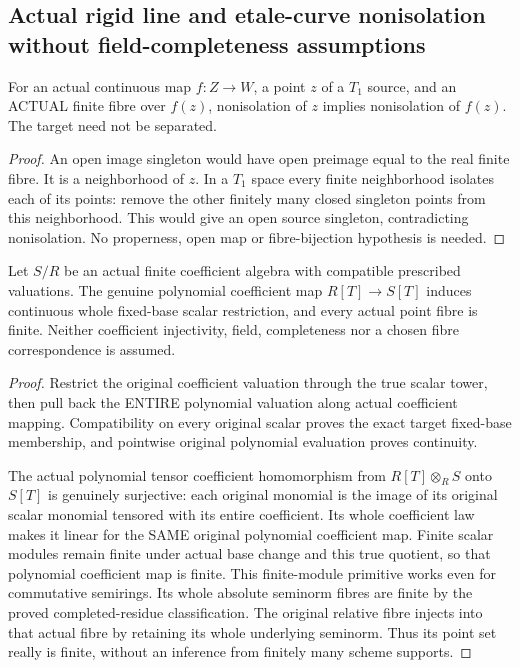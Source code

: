 \subsection{Actual rigid line and etale-curve nonisolation without field-completeness assumptions}
\label{subsec:rigid-etale-curve-nonisolation}

\begin{lemma}
\label{topology:actual-finite-fibre-nonisolation}
\leanok
For an actual continuous map $f:Z\to W$, a point $z$ of a $T_1$
source, and an ACTUAL finite fibre over $f(z)$, nonisolation of $z$
implies nonisolation of $f(z)$. The target need not be separated.
\end{lemma}
\begin{proof}
An open image singleton would have open preimage equal to the real
finite fibre. It is a neighborhood of $z$. In a $T_1$ space every
finite neighborhood isolates each of its points: remove the other
finitely many closed singleton points from this neighborhood. This
would give an open source singleton, contradicting nonisolation.
No properness, open map or fibre-bijection hypothesis is needed.
\end{proof}

\begin{theorem}
\label{spectrum:actual-finite-polynomial-scalar-restriction}
\leanok
{}
Let $S/R$ be an actual finite coefficient algebra with compatible
prescribed valuations. The genuine polynomial coefficient map
$R[T]\to S[T]$ induces continuous whole fixed-base scalar
restriction, and every actual point fibre is finite. Neither
coefficient injectivity, field, completeness nor a chosen fibre
correspondence is assumed.
\end{theorem}
\begin{proof}
Restrict the original coefficient valuation through the true scalar
tower, then pull back the ENTIRE polynomial valuation along actual
coefficient mapping. Compatibility on every original scalar proves
the exact target fixed-base membership, and pointwise original
polynomial evaluation proves continuity.

The actual polynomial tensor coefficient homomorphism from
$R[T]\otimes_R S$ onto $S[T]$ is genuinely surjective: each
original monomial is the image of its original scalar monomial
tensored with its entire coefficient. Its whole coefficient law
makes it linear for the SAME original polynomial coefficient map.
Finite scalar modules remain finite under actual base change and
this true quotient, so that polynomial coefficient map is finite.
This finite-module primitive works even for commutative semirings. Its whole absolute seminorm fibres are
finite by the proved completed-residue classification. The original
relative fibre injects into that actual fibre by retaining its
whole underlying seminorm. Thus its point set really is finite,
without an inference from finitely many scheme supports.
\end{proof}

